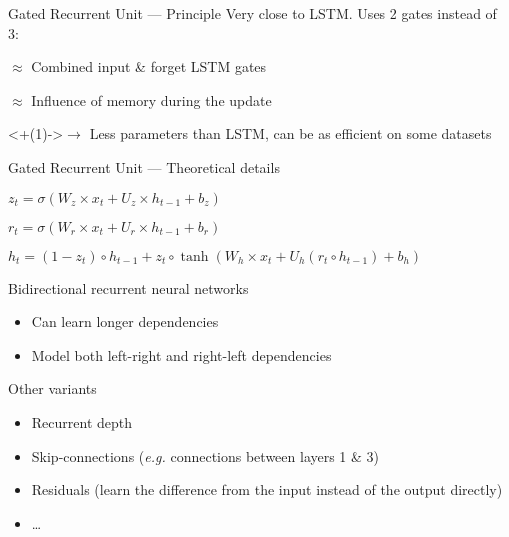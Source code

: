 \begin{frame}{Gated Recurrent Unit --- Principle}
  Very close to LSTM. Uses 2 gates instead of 3:
  \begin{description}[<+(1)->]
    \item[Update gate] $\approx$ Combined input \& forget LSTM gates
    \item[Reset gate] $\approx$ Influence of memory during the update
  \end{description}
  \onslide<+(1)->{$\rightarrow$ Less parameters than LSTM, can be as efficient on some datasets}
\end{frame}

\begin{frame}{Gated Recurrent Unit --- Theoretical details}
  \begin{description}[<+->]
    \item[Update gate] $z_t = \sigma (W_z \times x_t + U_z \times h_{t - 1} + b_z)$
    \item[Reset gate] $r_t = \sigma (W_r \times x_t + U_r \times h_{t - 1} + b_r)$
    \item[Output] $h_t = (1 - z_t) \circ h_{t - 1} + z_t \circ \tanh(W_h \times x_t + U_h (r_t \circ h_{t - 1}) + b_h)$
  \end{description}
\end{frame}

\begin{frame}{Bidirectional recurrent neural networks}
  \begin{itemize}[<+(1)->]
    \item Can learn longer dependencies
    \item Model both left-right and right-left dependencies
  \end{itemize}
\end{frame}

\begin{frame}{Other variants}
  \begin{itemize}[<+->]
    \item Recurrent depth
    \item Skip-connections (\emph{e.g.} connections between layers 1 \& 3)
    \item Residuals (learn the difference from the input instead of the output directly)
    \item …
  \end{itemize}
\end{frame}

